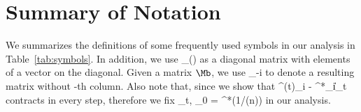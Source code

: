 \documentclass{article}
\def\[#1\]{{$#1$}}
\def\b#1{{\mathbf{#1}}}
\begin{document}
\appendix
\section{Summary of Notation}\label{app:summary_notation}
We summarizes the definitions of some frequently used symbols in our analysis in Table~\ref{tab:symbols}. In addition, we use \[\b{D}_{(\vb)}\] as a diagonal matrix with elements of a vector \[\b{v}\] on the diagonal. Given a matrix $\Mb$, we use \[\b{M}_{-i}\] to denote a resulting matrix without \[i\]-th column. Also note that, since we show that \[\|\b{A}^{(t)}_i - \b{A}^*_i\| \leq \epsilon_t\] contracts in every step, therefore we fix  \[\epsilon_t, \epsilon_0 = ^*(1/\log(n))\] in our analysis.
\end{document}
